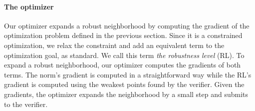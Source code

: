     \paragraph{The optimizer}
    Our optimizer expands a robust neighborhood by computing the gradient of the optimization problem defined in the previous section.
    Since it is a constrained optimization, we relax the constraint and add an equivalent term to the optimization goal, as standard.
    We call this term \emph{the robustness level} (RL).
    To expand a robust neighborhood, our optimizer 
    computes the gradients of both terms.
    The norm's gradient is computed in a straightforward way while the RL's gradient is computed using the weakest points found by the verifier.
    Given the gradients, the optimizer expands the neighborhood by a small step and submits to the verifier. 
    
